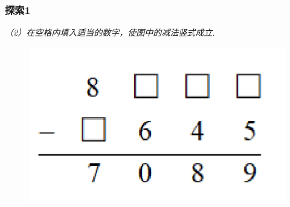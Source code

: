 \begin{frame}
    \frametitle{探索1}
    \textit{（2）在空格内填入适当的数字，使图中的减法竖式成立.}

    \begin{figure}[H] 
        \centering
        \includegraphics[width=1\textwidth]{./pics/Chapter_3/tansuo1_2.png}
    \end{figure}
\end{frame}

